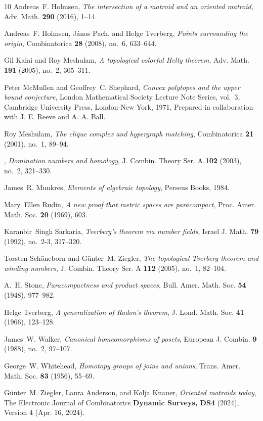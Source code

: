 \documentclass[a4paper,11pt,reqno, english]{amsart}
\theoremstyle{definition}
\theoremstyle{remark}
\begin{document}
\begin{small}
\begin{thebibliography}{10}
Andreas~F. Holmsen, \emph{The intersection of a matroid and an oriented
  matroid}, Adv. Math. \textbf{290} (2016), 1--14.

Andreas~F. Holmsen, J\'anos Pach, and Helge Tverberg, \emph{Points surrounding
  the origin}, Combinatorica \textbf{28} (2008), no.~6, 633--644.

Gil Kalai and Roy Meshulam, \emph{A topological colorful {H}elly theorem}, Adv.
  Math. \textbf{191} (2005), no.~2, 305--311.

Peter McMullen and Geoffrey~C. Shephard, \emph{Convex polytopes and the upper
  bound conjecture}, London Mathematical Society Lecture Note Series, vol.~3,
  Cambridge University Press, London-New York, 1971, Prepared in collaboration
  with J. E. Reeve and A. A. Ball.

Roy Meshulam, \emph{The clique complex and hypergraph matching}, Combinatorica
  \textbf{21} (2001), no.~1, 89--94.

\bysame, \emph{Domination numbers and homology}, J. Combin. Theory Ser. A
  \textbf{102} (2003), no.~2, 321--330.

James~R. Munkres, \emph{Elements of algebraic topology}, Perseus Books, 1984.

Mary~Ellen Rudin, \emph{A new proof that metric spaces are paracompact}, Proc.
  Amer. Math. Soc. \textbf{20} (1969), 603.

Karanbir~Singh Sarkaria, \emph{Tverberg's theorem via number fields}, Israel J.
  Math. \textbf{79} (1992), no.~2-3, 317--320.

Torsten Sch\"oneborn and G\"unter~M. Ziegler, \emph{The topological {T}verberg
  theorem and winding numbers}, J. Combin. Theory Ser. A \textbf{112} (2005),
  no.~1, 82--104.

A.~H. Stone, \emph{Paracompactness and product spaces}, Bull. Amer. Math. Soc.
  \textbf{54} (1948), 977--982.

Helge Tverberg, \emph{A generalization of {R}adon's theorem}, J. Lond. Math.
  Soc. \textbf{41} (1966), 123--128.

James~W. Walker, \emph{Canonical homeomorphisms of posets}, European J. Combin.
  \textbf{9} (1988), no.~2, 97--107.

George~W. Whitehead, \emph{Homotopy groups of joins and unions}, Trans. Amer.
  Math. Soc. \textbf{83} (1956), 55--69.

G{\"u}nter~M. Ziegler, Laura Anderson, and Kolja Knauer, \emph{Oriented
  matroids today}, The Electronic Journal of Combinatorics \textbf{Dynamic
  Surveys, DS4} (2024), Version 4 (Apr. 16, 2024).

\end{thebibliography}
\end{small}
\end{document}
